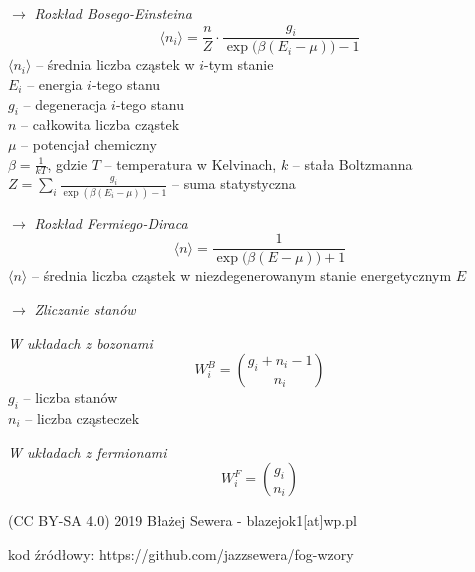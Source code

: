 \documentclass[12pt]{article}
\newenvironment{wzor}[1]{\par{\Large $\longrightarrow$ \textit{#1}}}
    {\newline {\color{grey} \rule{\linewidth}{0.3pt}}}
\newenvironment{bottompar}{\par\vspace*{\fill}}{\clearpage}
\begin{document}
\begin{wzor}{Rozkład Bosego-Einsteina}
    \begin{equation}
        \langle n_i \rangle = \frac{n}{Z} \cdot
            \frac{g_i}{\exp\big(\beta(E_i - \mu)\big) - 1}
    \end{equation}
    $\langle n_i \rangle$ -- średnia liczba cząstek w $i$-tym stanie\\
    $E_i$ -- energia $i$-tego stanu\\
    $g_i$ -- degeneracja $i$-tego stanu\\
    $n$ -- całkowita liczba cząstek\\
    $\mu$ -- potencjał chemiczny\\
    $\beta = \frac{1}{kT}$, gdzie $T$ -- temperatura w Kelvinach, $k$ -- stała Boltzmanna\\
    $Z = \sum\limits_i \frac{g_i}{\exp(\beta(E_i - \mu)) - 1}$
        -- suma statystyczna
\end{wzor}

\begin{wzor}{Rozkład Fermiego-Diraca}
    \begin{equation}
        \langle n \rangle = \frac{1}{\exp\big(\beta(E - \mu)\big) + 1}
    \end{equation}
    $\langle n \rangle$ -- średnia liczba cząstek w niezdegenerowanym stanie energetycznym $E$
\end{wzor}

\newpage
    
\begin{wzor}{Zliczanie stanów}
    \par \textit{W układach z bozonami}
    \begin{equation}
        W_i^B = \binom{g_i + n_i - 1}{n_i}
    \end{equation}
    $g_i$ -- liczba stanów\\
    $n_i$ -- liczba cząsteczek
    \par \textit{W układach z fermionami}
    \begin{equation}
        W_i^F = \binom{g_i}{n_i}
    \end{equation}
\end{wzor}

\begin{bottompar}
    {\footnotesize \ttfamily (CC BY-SA 4.0) 2019 Błażej Sewera - blazejok1[at]wp.pl\par
    kod źródłowy: https://github.com/jazzsewera/fog-wzory}
\end{bottompar}

\end{document}
